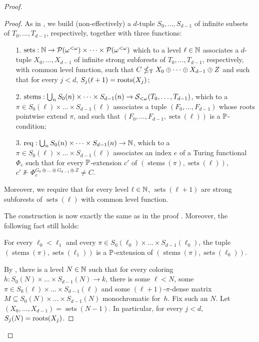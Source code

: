 \begin{proof}
\begin{proof}
As in , we build (non-effectively) a $d$-tuple $S_0, \dots, S_{d-1}$ of infinite subsets of $T_0, \dots, T_{d-1}$, respectively, together with three functions:
\begin{itemize}
	\item[1.] $\operatorname{sets}: \mathbb{N} \to \mathcal{P}({\omega^{<\omega}}) \times \dots \times \mathcal{P}({\omega^{<\omega}})$ which to a level $\ell \in \mathbb{N}$
	associates a $d$-tuple $X_0, \dots, X_{d-1}$ of infinite strong subforests of $T_0, \dots, T_{d-1}$, respectively, with common level function, such that $C \nleq_{\text{\upshape T}} X_0 \oplus \dots \oplus X_{d-1} \oplus Z$ and such that for every $j < d$, $S_j(\ell+1) = \operatorname{roots}(X_j)$;
	\item[2.] $\operatorname{stems}: \bigcup_n {S}_0(n) \times \dots \times {S}_{d-1}(n) \to \mathcal{S}_{<\omega}({T_0, \dots, T_{d-1}})$, which to a $\pi \in S_0(\ell) \times \dots \times S_{d-1}(\ell)$ associates a tuple $(F_0, \dots, F_{d-1})$ whose roots pointwise extend $\pi$, and such that $(F_0, \dots, F_{d-1}, \operatorname{sets}(\ell))$ is a $\mathbb{P}$-condition;
	\item[3.] $\operatorname{req}: \bigcup_n {S}_0(n) \times \dots \times {S}_{d-1}(n) \to \mathbb{N}$, which to a $\pi \in S_0(\ell) \times \dots \times S_{d-1}(\ell)$ associates an index $e$ of a Turing functional $\Phi_e$
	such that for every $\mathbb{P}$-extension $c'$ of $(\operatorname{stems}(\pi), \operatorname{sets}(\ell))$,
	$c' \nVdash \Phi_e^{G_0 \oplus \dots \oplus G_{d-1} \oplus Z} \neq C$.
\end{itemize}
Moreover, we require that for every level $\ell \in \mathbb{N}$,
$\operatorname{sets}(\ell+1)$ are strong subforests of $\operatorname{sets}(\ell)$
with common level function.

\bigskip
\noindent
The construction is now exactly the same as in the proof .
Moreover, the following fact still holds:

\begin{fact}\label{fact:pmtt2-level-homogeneous-density-below-a-cone-condition-extension}
For every $\ell_0 < \ell_1$ and every $\pi \in S_0(\ell_0) \times \dots \times S_{d-1}(\ell_0)$, 
the tuple $(\operatorname{stems}(\pi), \operatorname{sets}(\ell_1))$ is a $\mathbb{P}$-extension of $(\operatorname{stems}(\pi), \operatorname{sets}(\ell_0))$. 
\end{fact}


By , there is a level $N \in \mathbb{N}$
such that for every coloring $h: S_0(N) \times \dots \times S_{d-1}(N) \to k$,
there is some $\ell < N$, some $\pi \in S_0(\ell) \times \dots \times S_{d-1}(\ell)$
and some $(\ell+1)$-$\pi$-dense matrix $M \subseteq S_0(N) \times \dots \times S_{d-1}(N)$
monochromatic for~$h$. 
Fix such an $N$. Let $(X_0, \dots, X_{d-1}) = \operatorname{sets}(N-1)$. In particular, for every $j < d$, $S_j(N) = \operatorname{roots}(X_j)$.


\end{proof}
\end{proof}
